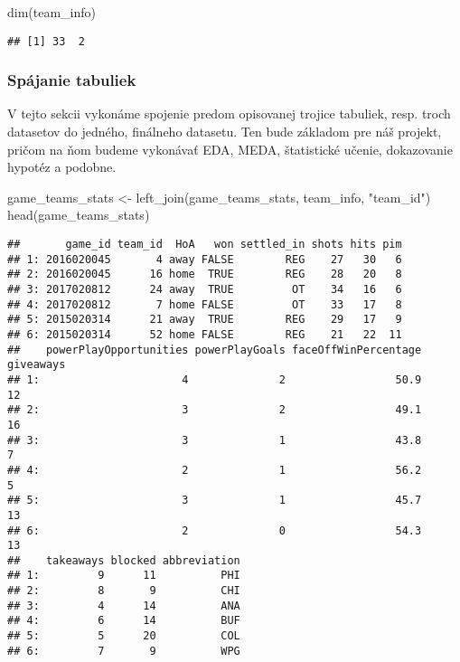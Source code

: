 \documentclass[
]{article}
\newenvironment{Shaded}{\begin{snugshade}}{\end{snugshade}}
\newcommand{\FunctionTok}[1]{\textcolor[rgb]{0.00,0.00,0.00}{#1}}
\newcommand{\NormalTok}[1]{#1}
\newcommand{\OtherTok}[1]{\textcolor[rgb]{0.56,0.35,0.01}{#1}}
\newcommand{\StringTok}[1]{\textcolor[rgb]{0.31,0.60,0.02}{#1}}
\begin{document}
\begin{Shaded}
\begin{Highlighting}[]
\FunctionTok{dim}\NormalTok{(team\_info)}
\end{Highlighting}
\end{Shaded}

\begin{verbatim}
## [1] 33  2
\end{verbatim}

\hypertarget{spuxe1janie-tabuliek}{%
\subsubsection{Spájanie tabuliek}\label{spuxe1janie-tabuliek}}

V tejto sekcii vykonáme spojenie predom opisovanej trojice tabuliek,
resp. troch datasetov do jedného, finálneho datasetu. Ten bude základom
pre náš projekt, pričom na ňom budeme vykonávať EDA, MEDA, štatistické
učenie, dokazovanie hypotéz a podobne.

\begin{Shaded}
\begin{Highlighting}[]
\NormalTok{game\_teams\_stats }\OtherTok{\textless{}{-}} \FunctionTok{left\_join}\NormalTok{(game\_teams\_stats, team\_info, }\StringTok{"team\_id"}\NormalTok{)}
\FunctionTok{head}\NormalTok{(game\_teams\_stats)}
\end{Highlighting}
\end{Shaded}

\begin{verbatim}
##       game_id team_id  HoA   won settled_in shots hits pim
## 1: 2016020045       4 away FALSE        REG    27   30   6
## 2: 2016020045      16 home  TRUE        REG    28   20   8
## 3: 2017020812      24 away  TRUE         OT    34   16   6
## 4: 2017020812       7 home FALSE         OT    33   17   8
## 5: 2015020314      21 away  TRUE        REG    29   17   9
## 6: 2015020314      52 home FALSE        REG    21   22  11
##    powerPlayOpportunities powerPlayGoals faceOffWinPercentage giveaways
## 1:                      4              2                 50.9        12
## 2:                      3              2                 49.1        16
## 3:                      3              1                 43.8         7
## 4:                      2              1                 56.2         5
## 5:                      3              1                 45.7        13
## 6:                      2              0                 54.3        13
##    takeaways blocked abbreviation
## 1:         9      11          PHI
## 2:         8       9          CHI
## 3:         4      14          ANA
## 4:         6      14          BUF
## 5:         5      20          COL
## 6:         7       9          WPG
\end{verbatim}
\end{document}
